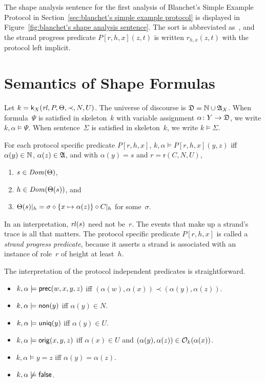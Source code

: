 \documentclass[12pt]{report}
\theoremstyle{definition}
\newcommand{\alga}{\alg{A}}
\newcommand{\sdom}{\fn{Dom}}
\newcommand{\role}{\mathsf{r}}
\newcommand{\skel}{\mathsf{k}}
\newcommand{\rl}{\fn{rl}}
\begin{document}
The shape analysis sentence for the first analysis of Blanchet's
Simple Example Protocol in Section~\ref{sec:blanchet's simple example
  protocol} is displayed in Figure~\ref{fig:blanchet's shape analysis
  sentence}.  The sort  is abbreviated as~, and the
strand progress predicate $P[r,h,x](z,t)$ is written $r_{h,x}(z,t)$
with the protocol left implicit.

\section{Semantics of Shape Formulas}

Let $k=\skel_X(\rl,P,\Theta,\prec,N,U)$.  The universe of discourse is
$\alg{D}=\nat\cup\alga_X$.  When formula~$\Psi$ is satisfied in
skeleton~$k$ with variable assignment $\alpha\colon Y\to \mathfrak D$, we
write $k,\alpha\models\Psi$.  When sentence~$\Sigma$ is satisfied in
skeleton~$k$, we write $k\models\Sigma$.

For each protocol specific predicate $P[r,h,x]$, $k,\alpha\models
P[r,h,x](y,z)$ iff $\alpha(y)\in\mathbb{N}$, $\alpha(z)\in\alga$, and with
$\alpha(y)=s$ and $r=\role(C,N,U)$,

\begin{enumerate}
\item $s\in\sdom(\Theta)$,
\item $h\in\sdom(\Theta(s))$, and
\item $\Theta(s)|_{h}=\sigma\circ\{x\mapsto\alpha(z)\}\circ C|_{h}$
  for some~$\sigma$.
\end{enumerate}

In an interpretation, $\rl(s)$ need not be~$r$.  The events that make
up a strand's trace is all that matters.  The protocol specific
predicate $P[r,h,x]$ is called a \emph{strand progress predicate}, because it asserts a
strand is associated with an instance of role~$r$ of height at
least~$h$.

The interpretation of the protocol independent predicates is
straightforward.
\begin{itemize}
\item $k,\alpha\models\operatorname{\mathsf{prec}}(w,x,y,z)$ iff
$(\alpha(w),\alpha(x))\prec(\alpha(y),\alpha(z))$.
\item $k,\alpha\models\operatorname{\mathsf{non}}(y)$ iff $\alpha(y)\in N$.
\item $k,\alpha\models\operatorname{\mathsf{uniq}}(y)$ iff $\alpha(y)\in U$.
\item $k,\alpha\models\operatorname{\mathsf{orig}}(x,y,z)$ iff $\alpha(x)\in U$ and
  $(\alpha(y),\alpha(z))\in\mathcal{O}_k(\alpha(x))$.
\item $k,\alpha\models y=z$ iff $\alpha(y)=\alpha(z)$.
\item $k,\alpha\not\models\operatorname{\mathsf{false}}$.
\end{itemize}
\end{document}
